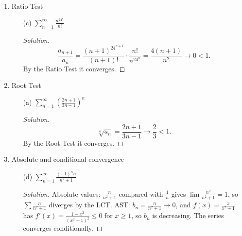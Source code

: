 \documentclass[12pt]{article}
\newenvironment{solution}
  {\renewcommand\qedsymbol{$\blacksquare$}\begin{proof}[Solution]}
  {\end{proof}}
\begin{document}
\begin{enumerate}
\begin{enumerate}
\item[(e)] $\sum_{n=1}^\infty\frac{(-1)^n\sqrt n}{n+4}$
\begin{solution}
Let $b_n=\frac{\sqrt n}{n+4}$ and $f(x)=\frac{\sqrt x}{x+4}$. Then
\[ f'(x)=\frac{\frac{x+4}{2\sqrt x}-\sqrt x}{(x+4)^2}=\frac{4-x}{2\sqrt x\,(x+4)^2}<0 \quad\text{for } x>4, \]
so $b_n$ is decreasing for $n\ge4$. Dividing top and bottom by $\sqrt n$, $b_n=\frac{1}{\sqrt n+4/\sqrt n}\to0$. The AST applies from $n=4$ on, so the series converges.
\end{solution}


\end{enumerate}

\setcounter{enumi}{22}
\item Ratio Test
\begin{enumerate}


\item[(c)] $\sum_{n=1}^\infty\frac{n^24^n}{n!}$
\begin{solution}
\[ \frac{a_{n+1}}{a_n}=\frac{(n+1)^24^{n+1}}{(n+1)!}\cdot\frac{n!}{n^24^n}=\frac{4(n+1)}{n^2}\to0<1. \]
By the Ratio Test it converges.
\end{solution}

\end{enumerate}

\setcounter{enumi}{23}
\item Root Test
\begin{enumerate}
\item[(a)] $\sum_{n=1}^\infty\left(\frac{2n+1}{3n-1}\right)^n$
\begin{solution}
\[ \sqrt[n]{a_n}=\frac{2n+1}{3n-1}\to\frac23<1. \]
By the Root Test it converges.
\end{solution}




\end{enumerate}

\setcounter{enumi}{24}
\item Absolute and conditional convergence
\begin{enumerate}



\item[(d)] $\sum_{n=1}^\infty\frac{(-1)^nn}{n^2+1}$
\begin{solution}
Absolute values: $\frac{n}{n^2+1}$ compared with $\frac1n$ gives $\lim\frac{n^2}{n^2+1}=1$, so $\sum\frac{n}{n^2+1}$ diverges by the LCT. AST: $b_n=\frac{n}{n^2+1}\to0$, and $f(x)=\frac{x}{x^2+1}$ has $f'(x)=\frac{1-x^2}{(x^2+1)^2}\le0$ for $x\ge1$, so $b_n$ is decreasing. The series converges conditionally.
\end{solution}



\end{enumerate}
\end{enumerate}
\end{document}
